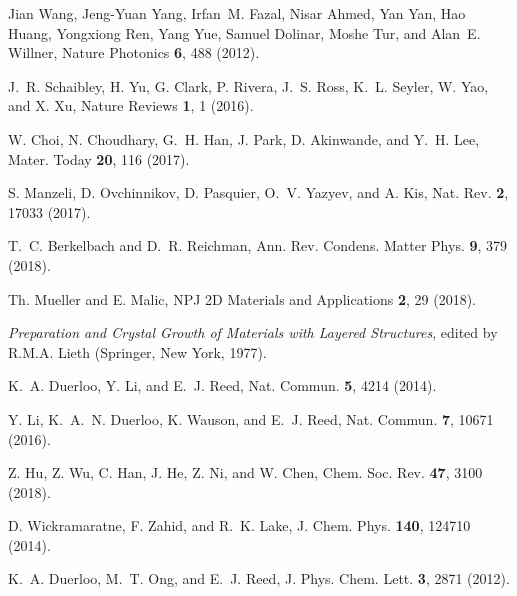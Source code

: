 \documentclass[aps,prb,superscriptaddress,letterpaper,amsmath,amssymb,twocolumn,preprintnumbers]{revtex4}
\begin{document}
{} %





%

%


\begin{thebibliography}{10}

Jian Wang, Jeng-Yuan Yang, Irfan~M. Fazal, Nisar Ahmed, Yan Yan, Hao Huang,
  Yongxiong Ren, Yang Yue, Samuel Dolinar, Moshe Tur, and Alan~E. Willner,
  Nature Photonics {\bf 6},  488   (2012).

J.~R. Schaibley, H. Yu, G. Clark, P. Rivera, J.~S. Ross, K.~L. Seyler, W. Yao,
  and X. Xu, Nature Reviews {\bf 1},  1   (2016).

W. Choi, N. Choudhary, G.~H. Han, J. Park, D. Akinwande, and Y.~H. Lee, Mater.
  Today {\bf 20},  116  (2017).

S. Manzeli, D. Ovchinnikov, D. Pasquier, O.~V. Yazyev, and A. Kis, Nat. Rev.
  {\bf 2},  17033   (2017).

T.~C. Berkelbach and D.~R. Reichman, Ann. Rev. Condens. Matter Phys. {\bf 9},
  379  (2018).

Th. Mueller and E. Malic, NPJ 2D Materials and Applications {\bf 2},  29
  (2018).

{\em {Preparation and Crystal Growth of Materials with Layered Structures}},
  edited by R.M.A. Lieth (Springer, New York, 1977).

K.~A. Duerloo, Y. Li, and E.~J. Reed, Nat. Commun. {\bf 5},  4214  (2014).

Y. Li, K.~A.~N. Duerloo, K. Wauson, and E.~J. Reed, Nat. Commun. {\bf 7},
  10671  (2016).

Z. Hu, Z. Wu, C. Han, J. He, Z. Ni, and W. Chen, Chem. Soc. Rev. {\bf 47},
  3100  (2018).

D. Wickramaratne, F. Zahid, and R.~K. Lake, J. Chem. Phys. {\bf 140},  124710
  (2014).

K.~A. Duerloo, M.~T. Ong, and E.~J. Reed, J. Phys. Chem. Lett. {\bf 3},  2871
  (2012).


\end{thebibliography}
\end{document}
